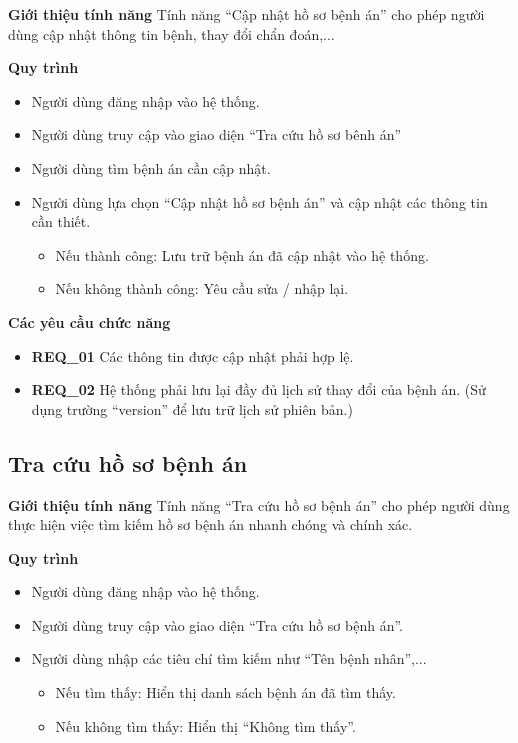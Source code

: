 \noindent \textbf{Giới thiệu tính năng}
Tính năng ``Cập nhật hồ sơ bệnh án'' cho phép người dùng cập nhật thông tin bệnh, thay đổi chẩn đoán,...

\noindent \textbf{Quy trình}
\begin{itemize}
    \item Người dùng đăng nhập vào hệ thống.
    \item Người dùng truy cập vào giao diện ``Tra cứu hồ sơ bênh án''
    \item Người dùng tìm bệnh án cần cập nhật.
    \item Người dùng lựa chọn ``Cập nhật hồ sơ bệnh án'' và cập nhật các thông tin cần thiết.
    \begin{itemize}
        \item Nếu thành công: Lưu trữ bệnh án đã cập nhật vào hệ thống.
        \item Nếu không thành công: Yêu cầu sửa / nhập lại.
    \end{itemize}
\end{itemize}

\noindent \textbf{Các yêu cầu chức năng}
\begin{itemize}
    \item \textbf{REQ\_01} Các thông tin được cập nhật phải hợp lệ.
    \item \textbf{REQ\_02} Hệ thống phải lưu lại đầy đủ lịch sử thay đổi của bệnh án. (Sử dụng trường ``version'' để lưu trữ lịch sử phiên bản.)
\end{itemize}

\subsection{Tra cứu hồ sơ bệnh án}

\noindent \textbf{Giới thiệu tính năng}
Tính năng ``Tra cứu hồ sơ bệnh án'' cho phép người dùng thực hiện việc tìm kiếm hồ sơ bệnh án nhanh chóng và chính xác.

\noindent \textbf{Quy trình}
\begin{itemize}
    \item Người dùng đăng nhập vào hệ thống.
    \item Người dùng truy cập vào giao diện ``Tra cứu hồ sơ bệnh án''.
    \item Người dùng nhập các tiêu chí tìm kiếm như ``Tên bệnh nhân'',...
    \begin{itemize}
        \item Nếu tìm thấy: Hiển thị danh sách bệnh án đã tìm thấy.
        \item Nếu không tìm thấy: Hiển thị ``Không tìm thấy''.
    \end{itemize}
\end{itemize}

